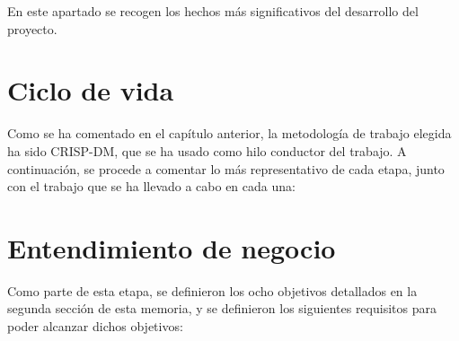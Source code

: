 
En este apartado se recogen los hechos más significativos del desarrollo del proyecto.

\section{Ciclo de vida}

Como se ha comentado en el capítulo anterior, la metodología de trabajo elegida ha sido CRISP-DM, que se ha usado como hilo conductor del trabajo. A continuación, se procede a comentar lo más representativo de cada etapa, junto con el trabajo que se ha llevado a cabo en cada una:

\section{Entendimiento de negocio}

Como parte de esta etapa, se definieron los ocho objetivos detallados en la segunda sección de esta memoria, y se definieron los siguientes requisitos para poder alcanzar dichos objetivos:

